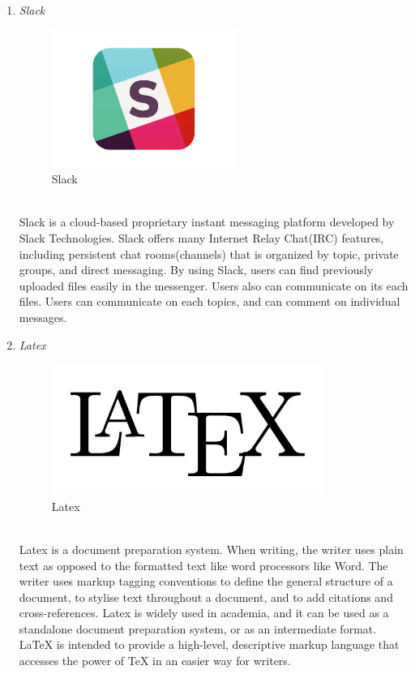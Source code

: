 \documentclass[conference]{IEEEtran}
\begin{document}
\begin{enumerate}
   \item \textit{Slack }
                \begin{figure}[htbp]
    \centerline{\includegraphics[width=60mm, scale=0.5]{fig/slack.png}}
    \caption{Slack}
    \label{fig}
    \end{figure}
   \\Slack is a cloud-based proprietary instant messaging platform developed by Slack Technologies. Slack offers many Internet Relay Chat(IRC) features, including persistent chat rooms(channels) that is organized by topic, private groups, and direct messaging. By using Slack, users can find previously uploaded files easily in the messenger. Users also can communicate on its each files. Users can communicate on each topics, and can comment on individual messages.\\
   \item \textit{Latex }
                   \begin{figure}[htbp]
    \centerline{\includegraphics[width=89mm, scale=0.5]{fig/latex.png}}
    \caption{Latex}
    \label{fig}
    \end{figure}
   \\Latex is a document preparation system. When writing, the writer uses plain text as opposed to the formatted text like word processors like Word. The writer uses markup tagging conventions to define the general structure of a document, to stylise text throughout a document, and to add citations and cross-references. Latex is widely used in academia, and it can be used as a standalone document preparation system, or as an intermediate format. LaTeX is intended to provide a high-level, descriptive markup language that accesses the power of TeX in an easier way for writers.\\

\end{enumerate}
\end{document}
